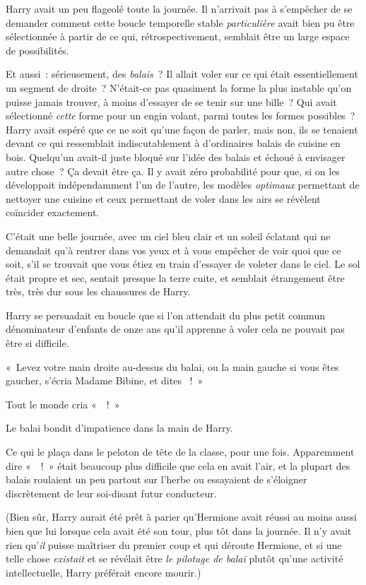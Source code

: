 Harry avait un peu flageolé toute la journée.
Il n'arrivait pas à s'empêcher de se demander comment cette boucle temporelle stable \emph{particulière} avait bien pu être sélectionnée à partir de ce qui, rétrospectivement, semblait être un large espace de possibilités.

Et aussi~: sérieusement, des \emph{balais}~?
Il allait voler sur ce qui était essentiellement un segment de droite~?
N'était-ce pas quasiment la forme la plus instable qu'on puisse jamais trouver, à moins d'essayer de se tenir sur une bille~?
Qui avait sélectionné \emph{cette} forme pour un engin volant, parmi toutes les formes possibles~?
Harry avait espéré que ce ne soit qu'une façon de parler, mais non, ils se tenaient devant ce qui ressemblait indiscutablement à d'ordinaires balais de cuisine en bois.
Quelqu'un avait-il juste bloqué sur l'idée des balais et échoué à envisager autre chose~?
Ça devait être ça.
Il y avait zéro probabilité pour que, si on les développait indépendamment l'un de l'autre, les modèles \emph{optimaux} permettant de nettoyer une cuisine et ceux permettant de voler dans les airs se révèlent coïncider exactement.

C'était une belle journée, avec un ciel bleu clair et un soleil éclatant qui ne demandait qu'à rentrer dans vos yeux et à vous empêcher de voir quoi que ce soit, s'il se trouvait que vous étiez en train d'essayer de voleter dans le ciel.
Le sol était propre et sec, sentait presque la terre cuite, et semblait étrangement être très, très dur sous les chaussures de Harry.

Harry se persuadait en boucle que si l'on attendait du plus petit commun dénominateur d'enfants de onze ans qu'il apprenne à voler cela ne pouvait pas être si difficile.

«~Levez votre main droite au-dessus du balai, ou la main gauche si vous êtes gaucher, s'écria Madame Bibine, et dites ~!~»

Tout le monde cria «~~!~»

Le balai bondit d'impatience dans la main de Harry.

Ce qui le plaça dans le peloton de tête de la classe, pour une fois.
Apparemment dire «~~!~» était beaucoup plus difficile que cela en avait l'air, et la plupart des balais roulaient un peu partout sur l'herbe ou essayaient de s'éloigner discrètement de leur soi-disant futur conducteur.

(Bien sûr, Harry aurait été prêt à parier qu'Hermione avait réussi au moins aussi bien que lui lorsque cela avait été son tour, plus tôt dans la journée.
Il n'y avait rien qu'\emph{il} puisse maîtriser du premier coup et qui déroute Hermione, et si une telle chose \emph{existait} et se révélait être \emph{le pilotage de balai} plutôt qu'une activité intellectuelle, Harry préférait encore mourir.)

